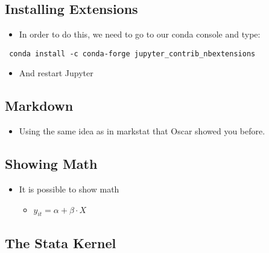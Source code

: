\documentclass[10pt,parskip=half,
	toc=sectionentrywithdots,
	bibliography=totocnumbered,
	captions=tableheading,numbers=noendperiod]{scrartcl}
\providecommand{\tightlist}{%
  \setlength{\itemsep}{0pt}\setlength{\parskip}{0pt}}
\begin{document}
\hypertarget{installing-extensions}{%
\subsection{Installing Extensions}\label{installing-extensions}}

\begin{itemize}
\tightlist
\item
  In order to do this, we need to go to our conda console and type:
\end{itemize}

\begin{verbatim}
 conda install -c conda-forge jupyter_contrib_nbextensions 
\end{verbatim}

\begin{itemize}
\tightlist
\item
  And restart Jupyter
\end{itemize}

\hypertarget{markdown}{%
\subsection{Markdown}\label{markdown}}

\begin{itemize}
\tightlist
\item
  Using the same idea as in markstat that Oscar showed you before.
\end{itemize}

\hypertarget{showing-math}{%
\subsection{Showing Math}\label{showing-math}}

\begin{itemize}
\tightlist
\item
  It is possible to show math

  \begin{itemize}
  \tightlist
  \item
    \(y_{it} = \alpha + \beta\cdot X\)
  \end{itemize}
\end{itemize}

\hypertarget{the-stata-kernel}{%
\subsection{The Stata Kernel}\label{the-stata-kernel}}
\end{document}
